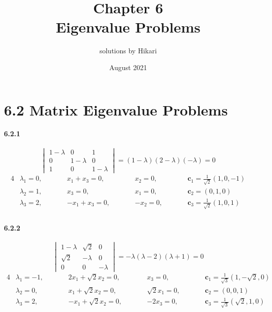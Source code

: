 \documentclass[a4paper]{article}
\title{Chapter 6\\Eigenvalue Problems}
\author{solutions by Hikari}
\date{August 2021}
\begin{document}
\newcommand{\br}[2]{\langle#1|#2\rangle}
\newcommand{\brr}[2]{\left\langle#1|#2\right\rangle}
\newcommand{\pdv}[2]{\frac{\partial#1}{\partial#2}}
\newcommand{\M}{\mathrm}
\newcommand{\V}{\mathbf}
\newcommand{\VE}{\mathbf{\hat{e}}}
\newcommand{\ket}[1]{|#1\rangle}
\newcommand{\bra}[1]{\langle#1|}

\maketitle

\section*{6.2 Matrix Eigenvalue Problems}

\newcommand{\n}{\lambda}
\paragraph{6.2.1}
\[
\begin{vmatrix}
1-\n&0&1\\
0&1-\n&0\\
1&0&1-\n
\end{vmatrix}=
(1-\n)(2-\n)(-\n)=0
\]
\begin{alignat*}{4}
    & \n_1=0,\qquad && x_1+x_3=0,\qquad && x_2=0,\qquad && \V{c}_1=\frac{1}{\sqrt{2}}(1,0,-1)\\
    & \n_2=1,\qquad && x_3=0,\qquad && x_1=0,\qquad && \V{c}_2=(0,1,0)\\
    & \n_3=2,\qquad && -x_1+x_3=0,\qquad && -x_2=0,\qquad && \V{c}_3=\frac{1}{\sqrt{2}}(1,0,1)\\
\end{alignat*}

\paragraph{6.2.2}
\[
\begin{vmatrix}
1-\n&\sqrt{2}&0\\
\sqrt{2}&-\n&0\\
0&0&-\n
\end{vmatrix}=
-\n(\n-2)(\n+1)=0
\]
\begin{alignat*}{4}
    & \n_1=-1,\qquad && 2x_1+\sqrt{2}x_2=0,\qquad && x_3=0,\qquad && \V{c}_1=\frac{1}{\sqrt{3}}(1,-\sqrt{2},0)\\
    & \n_2=0,\qquad && x_1+\sqrt{2}x_2=0,\qquad && \sqrt{2}x_1=0,\qquad && \V{c}_2=(0,0,1)\\
    & \n_3=2,\qquad && -x_1+\sqrt{2}x_2=0,\qquad && -2x_3=0,\qquad && \V{c}_3=\frac{1}{\sqrt{3}}(\sqrt{2},1,0)\\
\end{alignat*}
\end{document}
